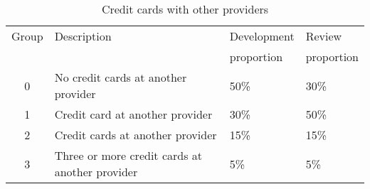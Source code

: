 \documentclass{article}
\theoremstyle{def}
\begin{document}
\begin{table}[H]%
\caption{Credit cards with other providers}
\label{tab2}
\centering
\small
\begin{tabular}{clll}
\hline
Group & Description & Development & Review \\
 &  & proportion & proportion \\
\hline
0 & No credit cards at another provider & 50\%  & 30\% \\
1 & Credit card at another provider & 30\%  & 50\% \\
2 & Credit cards at another provider & 15\% & 15\% \\
3 & Three or more credit cards at another provider & 5\% & 5\% \\
\hline
\end{tabular}
\end{table}

\end{document}
